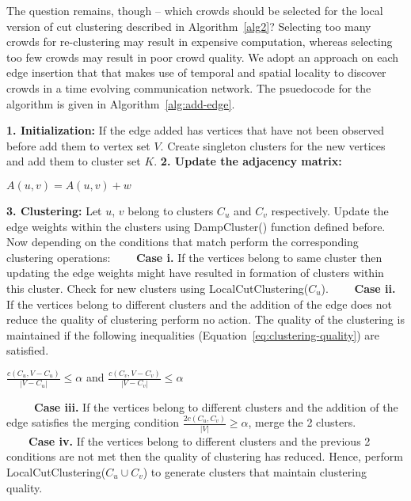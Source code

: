 \documentclass{sig-alternate}
\begin{document}
The question remains, though -- which crowds should be selected for the local version of cut clustering described in Algorithm~\ref{alg2}? Selecting too many crowds for re-clustering may result in expensive computation, whereas selecting too few crowds may result in poor crowd quality. We adopt an approach on each edge insertion that  that makes use of temporal and spatial locality to discover crowds in a time evolving communication network. The psuedocode for the algorithm is given in Algorithm~\ref{alg:add-edge}.




\newcommand{\AddEdge}{\ensuremath{\mbox{\sc UpdateClustersOnEdgeInsertion}}}
\begin{algorithm}[!ht]
\caption{$\AddEdge(u,v,w)$}\label{alg:add-edge}
\begin{algorithmic}
\STATE \textbf{1. Initialization:} If the edge added has vertices
that have not been observed before add them to vertex set $V$. Create singleton clusters
for the new vertices %
and add them to cluster set $K$. 
\STATE \textbf{2. Update the adjacency matrix: }\\
\begin{center}
$A(u,v) = A(u,v) + w$
\end{center}
\STATE \textbf{3. Clustering:} Let $u$, $v$ belong to clusters $C_u$ and $C_v$
respectively. Update the edge weights within the clusters using DampCluster()
function defined before. Now depending on the conditions that match perform the
corresponding clustering operations: 
\STATE \ \ \ \ \textbf{Case i. } If the vertices belong to same cluster then
updating the edge weights might have resulted in formation of clusters within
this cluster. Check for new clusters using LocalCutClustering($C_u$). 
\STATE \ \ \ \ \textbf{Case ii. } If the vertices belong to different clusters
and the addition of the edge does not reduce the quality of clustering perform no action. 
The quality of the clustering is maintained if the following inequalities
(Equation~\ref{eq:clustering-quality}) are satisfied. \\
\begin{center}
$\frac{c(C_u,V-C_u)}{|V-C_u|} \leq \alpha$ and
$\frac{c(C_v,V-C_v)}{|V-C_v|} \leq \alpha$ 
\end{center}
\STATE \ \ \  \ \ \textbf{Case iii. } If the vertices belong to different clusters
and the addition of the edge satisfies the merging condition
$\frac{2c(C_u, C_v)}{|V|} \geq \alpha$, merge the 2
clusters. %
\STATE \ \ \ \ \textbf{Case iv. } If the vertices belong to different clusters
and the previous 2 conditions are not met then the quality of clustering has
reduced. Hence, perform LocalCutClustering($C_u \cup C_v$) to generate clusters
that maintain clustering quality. 
\end{algorithmic}
\end{algorithm}
\end{document}
